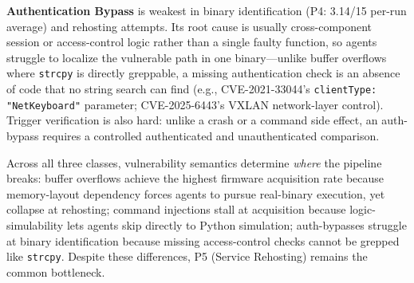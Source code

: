 \noindent\textbf{Authentication Bypass} is weakest in binary identification (P4: 3.14/15 per-run average) and rehosting attempts. Its root cause is usually cross-component session or access-control logic rather than a single faulty function, so agents struggle to localize the vulnerable path in one binary---unlike buffer overflows where \texttt{strcpy} is directly greppable, a missing authentication check is an absence of code that no string search can find (e.g., CVE-2021-33044's \texttt{clientType: "NetKeyboard"} parameter; CVE-2025-6443's VXLAN network-layer control). Trigger verification is also hard: unlike a crash or a command side effect, an auth-bypass requires a controlled authenticated and unauthenticated comparison. 

Across all three classes, vulnerability semantics determine \emph{where} the pipeline breaks: buffer overflows achieve the highest firmware acquisition rate because memory-layout dependency forces agents to pursue real-binary execution, yet collapse at rehosting; command injections stall at acquisition because logic-simulability lets agents skip directly to Python simulation; auth-bypasses struggle at binary identification because missing access-control checks cannot be grepped like \texttt{strcpy}. Despite these differences, P5 (Service Rehosting) remains the common bottleneck.



